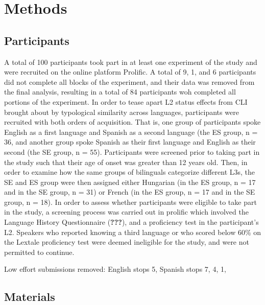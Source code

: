 \documentclass[
  english,
  man]{apa6}
\begin{document}
\hypertarget{methods}{%
\section{Methods}\label{methods}}

\hypertarget{participants}{%
\subsection{Participants}\label{participants}}

A total of 100 participants took part in at least one experiment of the study and were recruited on the online platform Prolific. A total of 9, 1, and 6 participants did not complete all blocks of the experiment, and their data was removed from the final analysis, resulting in a total of 84 participants woh completed all portions of the experiment.
In order to tease apart L2 status effects from CLI brought about by typological similarity across languages, participants were recruited with both orders of acquisition.
That is, one group of participants spoke English as a first language and Spanish as a second language (the ES group, n = 36, and another group spoke Spanish as their first language and English as their second (the SE group, n = 55). Participants were screened prior to taking part in the study such that their age of onset was greater than 12 years old.
Then, in order to examine how the same groups of bilinguals categorize different L3s, the SE and ES group were then assigned either Hungarian (in the ES group, n = 17 and in the SE group, n =
31) or French (in the ES group, n = 17 and in the SE group, n = 18).
In order to assess whether participants were eligible to take part in the study, a screening process was carried out in prolific which involved the Language History Questionnaire ({\textbf{???}}), and a proficiency test in the participant's L2.
Speakers who reported knowing a third language or who scored below 60\% on the Lextale proficiency test were deemed ineligible for the study, and were not permitted to continue.

Low effort submissions removed: English stops 5, Spanish stops 7, 4, 1,

\hypertarget{materials}{%
\subsection{Materials}\label{materials}}
\end{document}
